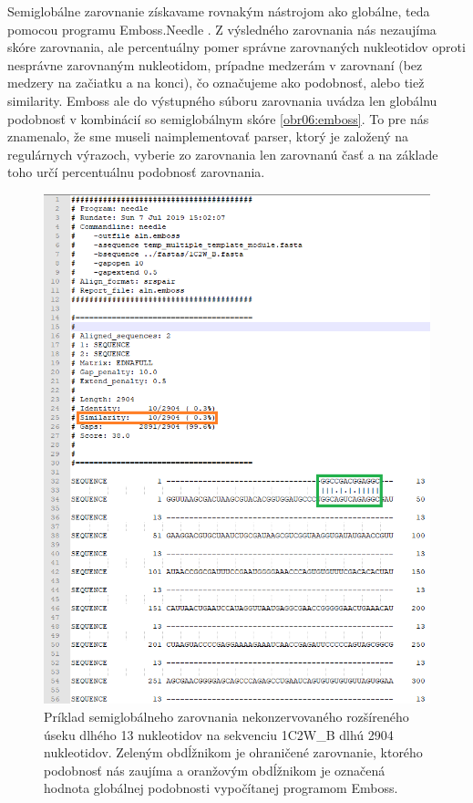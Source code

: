\indent Semiglobálne zarovnanie získavame rovnakým nástrojom ako globálne, teda pomocou programu Emboss.Needle \cite{Emboss}. Z výsledného zarovnania nás nezaujíma skóre zarovnania, ale percentuálny pomer správne zarovnaných nukleotidov oproti nesprávne zarovnaným nukleotidom, prípadne medzerám v  zarovnaní (bez medzery na začiatku a na konci), čo označujeme ako podobnosť, alebo tiež similarity. Emboss ale do výstupného súboru zarovnania uvádza len globálnu podobnosť v kombinácií so semiglobálnym skóre \autoref{obr06:emboss}. To pre nás znamenalo, že sme museli naimplementovať parser, ktorý je založený na regulárnych výrazoch, vyberie zo zarovnania len zarovnanú časť a na základe toho určí percentuálnu podobnosť zarovnania.
\begin{figure}%
\includegraphics[width=\textwidth]{../img/emboss}
\caption{Príklad semiglobálneho zarovnania nekonzervovaného rozšíreného úseku dlhého 13 nukleotidov na sekvenciu 1C2W\_B dlhú 2904 nukleotidov. Zeleným obdĺžnikom je ohraničené zarovnanie, ktorého podobnosť nás zaujíma a oranžovým obdĺžnikom je označená hodnota globálnej podobnosti vypočítanej programom Emboss.}
\label{obr06:emboss}
\end{figure}


